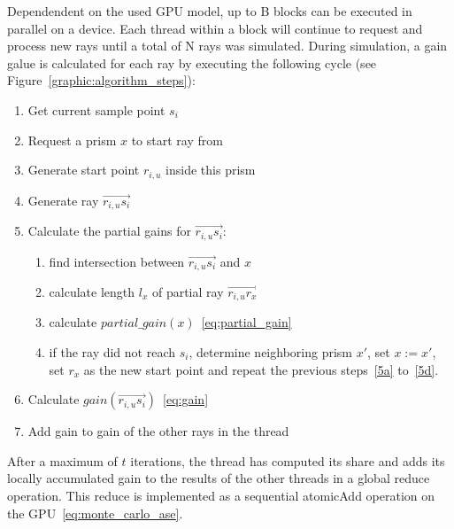   Dependendent on the used GPU model, up to B blocks can be executed
  in parallel on a device. Each thread within a block will continue to
  request and process new rays until a total of N rays was
  simulated. During simulation, a gain galue is calculated for each
  ray by executing the following cycle (see
  Figure~\ref{graphic:algorithm_steps}):
    \begin{enumerate}
      \item Get current sample point $s_i$
      \item Request a prism $x$ to start ray from
      \item Generate start point $r_{i,u}$ inside this prism
      \item Generate ray $\overrightarrow{r_{i,u}s_i}$
      \item Calculate the partial gains for
        $\overrightarrow{r_{i,u}s_i}$:
        \begin{enumerate}
          \item find intersection between
            $\overrightarrow{r_{i,u}s_i}$ and $x$\label{5a}
          \item calculate length $l_x$ of partial ray
            $\overrightarrow{r_{i,u}r_x}$
          \item calculate $partial\_gain(x)$~\eqref{eq:partial_gain}
          \item if the ray did not reach $s_i$, determine neighboring
            prism $x'$, set $x := x'$, set $r_x$ as the new start
            point and repeat the previous steps~\ref{5a} to~\ref{5d}.
            \label{5d}
        \end{enumerate}
      \item Calculate
        $gain(\overrightarrow{r_{i,u}s_i})$~\eqref{eq:gain}
      \item Add gain to gain of the other rays in the thread
    \end{enumerate}
    After a maximum of $t$ iterations, the thread has computed its
    share and adds its locally accumulated gain to the results of the
    other threads in a global reduce operation. This reduce is
    implemented as a sequential atomicAdd operation on the
    GPU~\eqref{eq:monte_carlo_ase}.


